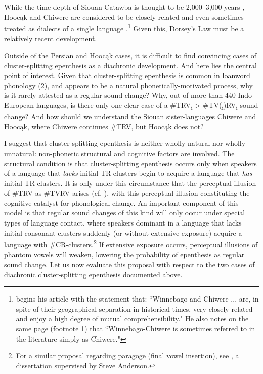\documentclass[output=paper,
modfonts
]{LSP/langsci}
\begin{document}
While the time-depth of Siouan-Catawba is thought to be 2,000--3,000
years \citep{parks2001a}, Hoocąk and Chiwere are considered to be
closely related and even sometimes treated as dialects of a single
language \citep{miner1979a}.\footnote{\citet[25]{miner1979a} begins his article with
  the statement that: ``Winnebago and Chiwere ... are, in spite of their
  geographical separation in historical times, very closely related and
  enjoy a high degree of mutual comprehensibility." He also notes on the
  same page (footnote 1) that ``Winnebago-Chiwere is sometimes referred
  to in the literature simply as Chiwere."} Given this, Dorsey's Law
must be a relatively recent development.

Outside of the Persian and Hoocąk cases, it is difficult to find
convincing cases of cluster-splitting epenthesis as a diachronic
development. And here lies the central point of interest. Given that
cluster-splitting epenthesis is common in loanword phonology (2), and
appears to be a natural phonetically-motivated process, why is it rarely
attested as a regular sound change? Why, out of more than 440
Indo-European languages, is there only one clear case of a
\#TRV\textsubscript{i} \textgreater{}
\#TV(\textsubscript{i})RV\textsubscript{i} sound change? And how should
we understand the Siouan sister-languages Chiwere and Hoocąk, where
Chiwere continues \#TRV, but Hoocąk does not?

I suggest that cluster-splitting epenthesis is neither wholly natural
nor wholly unnatural: non-phonetic structural and cognitive factors are
involved. The structural condition is that cluster-splitting epenthesis
occurs only when speakers of a language that \emph{lacks} initial TR
clusters begin to acquire a language that \emph{has} initial TR
clusters. It is only under this circumstance that the perceptual
illusion of \#TRV as \#TVRV arises (cf. \citealt{dupoux1999a}), with this
perceptual illusion constituting the cognitive catalyst for phonological
change. An important component of this model is that regular sound
changes of this kind will only occur under special types of language
contact, where speakers dominant in a language that lacks initial
consonant clusters suddenly (or without extensive exposure) acquire a
language with \#CR-clusters.\footnote{For a similar proposal regarding
  paragoge (final vowel insertion), see \citet{ng2015a}, a
  dissertation supervised by Steve Anderson.} If
extensive exposure occurs, perceptual illusions of phantom vowels will
weaken, lowering the probability of epenthesis as regular sound change.
Let us now evaluate this proposal with respect to the two cases of
diachronic cluster-splitting epenthesis documented above.
\end{document}
